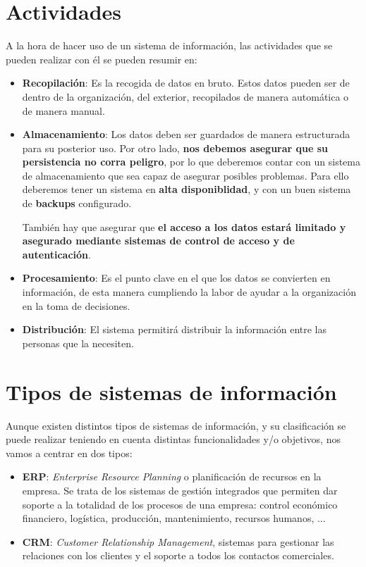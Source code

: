 
\section{Actividades}

A la hora de hacer uso de un sistema de información, las actividades que se pueden realizar con él se pueden resumir en:

\begin{itemize}
    \item \textbf{Recopilación}: Es la recogida de datos en bruto. Estos datos pueden ser de dentro de la organización, del exterior, recopilados de manera automática o de manera manual.
    \item \textbf{Almacenamiento}: Los datos deben ser guardados de manera estructurada para su posterior uso. Por otro lado, \textbf{nos debemos asegurar que su persistencia no corra peligro}, por lo que deberemos contar con un sistema de almacenamiento que sea capaz de asegurar posibles problemas. Para ello deberemos tener un sistema en \textbf{alta disponiblidad}, y con un buen sistema de \textbf{backups} configurado.

    También hay que asegurar que \textbf{el acceso a los datos estará limitado y asegurado mediante sistemas de control de acceso y de autenticación}.

    \item \textbf{Procesamiento}: Es el punto clave en el que los datos se convierten en información, de esta manera cumpliendo la labor de ayudar a la organización en la toma de decisiones.

    \item \textbf{Distribución}: El sistema permitirá distribuir la información entre las personas que la necesiten.
\end{itemize}


\section{Tipos de sistemas de información}

Aunque existen distintos tipos de sistemas de información, y su clasificación se puede realizar teniendo en cuenta distintas funcionalidades y/o objetivos, nos vamos a centrar en dos tipos:

\begin{itemize}
    \item \textbf{ERP}: \textit{Enterprise Resource Planning} o planificación de recursos en la empresa. Se trata de los sistemas de gestión integrados que permiten dar soporte a la totalidad de los procesos de una empresa: control económico financiero, logística, producción, mantenimiento, recursos humanos, ...

    \item \textbf{CRM}: \textit{Customer Relationship Management}, sistemas para gestionar las relaciones con los clientes y el soporte a todos los contactos comerciales.
\end{itemize}